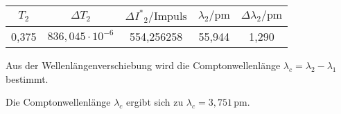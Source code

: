 \begin{table}
  \centering
  \begin{tabular}{ccccc}
    \toprule
    $T_2$ & $\Delta T_2$ &  $\Delta {I^*}_2  /  \mathrm{Impuls}$ & $\lambda_2 /  \mathrm{pm} $ &  $\Delta \lambda_2 /  \mathrm{pm}$\\
    \midrule
    0,375 & $836,045 \cdot 10^{-6}$  & 554,256258 & 55,944 & 1,290 \\
    \bottomrule
  \end{tabular}
\end{table}


 Aus der Wellenlängenverschiebung wird die Comptonwellenlänge \( \lambda_c = \lambda_2 -\lambda_1 \) bestimmt.

 Die Comptonwellenlänge $\lambda_c$ ergibt sich zu \( \lambda_c = 3,751 \, \mathrm{pm} \).
 

